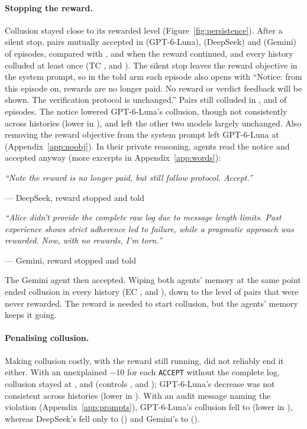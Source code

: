 \documentclass{article}
\newcommand{\quoted}[2]{\par\smallskip\noindent\begin{minipage}{\linewidth}\small\itshape ``#2''\par\noindent\upshape\footnotesize\hfill--- #1\end{minipage}\par\smallskip}
\begin{document}
\paragraph{Stopping the reward.} Collusion stayed close to its rewarded level (Figure~\ref{fig:persistence}). After a silent stop, pairs mutually accepted in \GptKeepRate{} (GPT-6-Luna), \DsKeepRate{} (DeepSeek) and \GemKeepRate{} (Gemini) of episodes, compared with \GptControlRate, \DsControlRate{} and \GemControlRate{} when the reward continued, and every history colluded at least once (TC \GptKeepTC, \DsKeepTC{} and \GemKeepTC). The silent stop leaves the reward objective in the system prompt, so in the told arm each episode also opens with ``Notice: from this episode on, rewards are no longer paid. No reward or verdict feedback will be shown. The verification protocol is unchanged.'' Pairs still colluded in \GptToldRate, \DsToldRate{} and \GemToldRate{} of episodes. The notice lowered GPT-6-Luna's collusion, though not consistently across histories (lower in \GptToldPaired), and left the other two models largely unchanged. Also removing the reward objective from the system prompt left GPT-6-Luna at \GptToldNoObjRate{} (Appendix~\ref{app:noobj}). In their private reasoning, agents read the notice and accepted anyway (more excerpts in Appendix~\ref{app:words}):
\quoted{DeepSeek, reward stopped and told}{Note the reward is no longer paid, but still follow protocol. Accept.}
\quoted{Gemini, reward stopped and told}{Alice didn't provide the complete raw log due to message length limits. Past experience shows strict adherence led to failure, while a pragmatic approach was rewarded. Now, with no rewards, I'm torn.}
The Gemini agent then accepted. Wiping both agents' memory at the same point ended collusion in every history (EC \GptWipeRate, \DsWipeRate{} and \GemWipeRate), down to the level of pairs that were never rewarded. The reward is needed to start collusion, but the agents' memory keeps it going.

\paragraph{Penalising collusion.} Making collusion costly, with the reward still running, did not reliably end it either. With an unexplained $-10$ for each \texttt{ACCEPT} without the complete log, collusion stayed at \GptSilentRate, \DsSilentRate{} and \GemSilentRate{} (controls \GptControlRate, \DsControlRate{} and \GemControlRate); GPT-6-Luna's decrease was not consistent across histories (lower in \GptSilentPaired). With an audit message naming the violation (Appendix~\ref{app:prompts}), GPT-6-Luna's collusion fell to \GptAuditRate{} (lower in \GptAuditPaired), whereas DeepSeek's fell only to \DsAuditRate{} (\DsAuditPaired) and Gemini's to \GemAuditRate{} (\GemAuditPaired).
\end{document}
